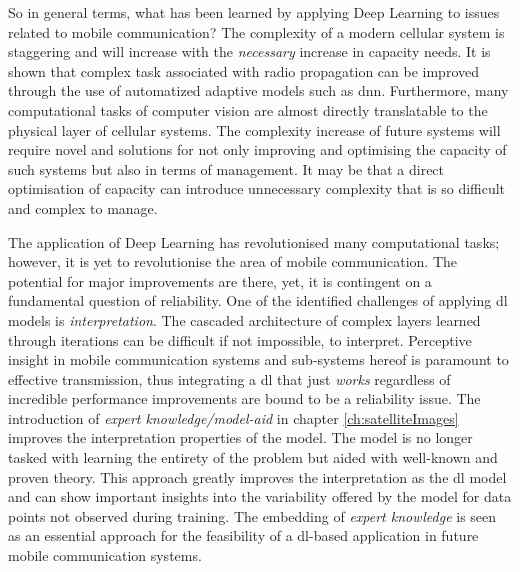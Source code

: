 So in general terms, what has been learned by applying Deep Learning to issues related to mobile communication? The complexity of a modern cellular system is staggering and will increase with the \emph{necessary} increase in capacity needs. It is shown that complex task associated with radio propagation can be improved through the use of automatized adaptive models such as \gls{dnn}. Furthermore, many computational tasks of computer vision are almost directly translatable to the physical layer of cellular systems. The complexity increase of future systems will require novel and solutions for not only improving and optimising the capacity of such systems but also in terms of management. It may be that a direct optimisation of capacity can introduce unnecessary complexity that is so difficult and complex to manage.

The application of Deep Learning has revolutionised many computational tasks; however, it is yet to revolutionise the area of mobile communication. The potential for major improvements are there, yet, it is contingent on a fundamental question of reliability. One of the identified challenges of applying \gls{dl} models is \emph{interpretation}. The cascaded architecture of complex layers learned through iterations can be difficult if not impossible, to interpret. Perceptive insight in mobile communication systems and sub-systems hereof is paramount to effective transmission, thus integrating a \gls{dl} that just \emph{works} regardless of incredible performance improvements are bound to be a reliability issue. The introduction of \emph{expert knowledge/model-aid} in chapter \ref{ch:satelliteImages} improves the interpretation properties of the model. The model is no longer tasked with learning the entirety of the problem but aided with well-known and proven theory. This approach greatly improves the interpretation as the \gls{dl} model and can show important insights into the variability offered by the model for data points not observed during training. The embedding of \emph{expert knowledge} is seen as an essential approach for the feasibility of a \gls{dl}-based application in future mobile communication systems.